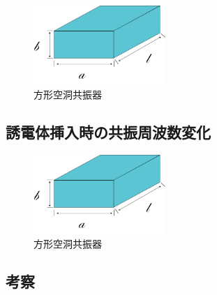 \begin{figure}[h]
  \begin{center}
    \includegraphics[width=5cm]{./image/空洞共振器.png}
    \caption{方形空洞共振器}
    \label{fig:Cavity}
  \end{center}
\end{figure}

\subsection{誘電体挿入時の共振周波数変化}

\vspace{10 mm}

\begin{figure}[h]
  \begin{center}
    \includegraphics[width=5cm]{./image/空洞共振器.png}
    \caption{方形空洞共振器}
    \label{fig:Cavity}
  \end{center}
\end{figure}

\subsection{考察}
